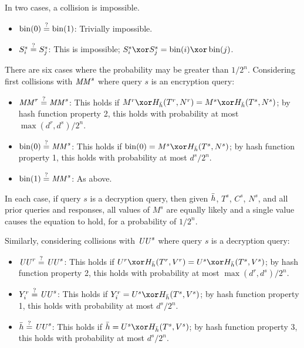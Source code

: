 \documentclass[hctr2.tex]{subfiles}
\begin{document}
In two cases, a collision is impossible.

\begin{itemize}
    \item \(\operatorname{bin}(0) \stackrel{\text{?}}{=} \operatorname{bin}(1)\): 
    Trivially impossible.
    \item 
    \(S_i^s \stackrel{\text{?}}{=} S_j^s\):
    This is impossible; 
    \(S_i^s \xor S_j^s = \fromint(i) \xor \fromint(j)\).
\end{itemize}

There are six cases where the probability may
be greater than \(1/2^n\).
Considering first collisions with \(\mathit{MM}^s\) where
query \(s\) is an encryption query:

\begin{itemize}
    \item \(\mathit{MM}^r \stackrel{\text{?}}{=} \mathit{MM}^s\):
    This holds if \(M^r \xor H_{\hgen}(T^r, N^r) = M^s \xor H_{\hgen}(T^s, N^s)\);
    by hash function property 2, this holds with probability at most
    \(\max(d^r, d^s)/2^n\).
    \item \(\operatorname{bin}(0) \stackrel{\text{?}}{=} \mathit{MM}^s\):
    This holds if \(\fromint(0) = M^s \xor H_{\hgen}(T^s, N^s)\);
    by hash function property 1, this holds with probability at most
    \(d^s/2^n\).
    \item \(\operatorname{bin}(1) \stackrel{\text{?}}{=} \mathit{MM}^s\):
    As above.
\end{itemize}

In each case, if query \(s\) is a decryption query,
then given \(\bar{h}\), \(T^s\), \(C^s\), \(N^s\),
and all prior queries and responses,
all values of \(M^s\) are equally likely 
and a single value causes the equation to hold,
for a probability of \(1/2^n\).

Similarly, considering collisions with \(\mathit{UU}^s\) where
query \(s\) is a decryption query:

\begin{itemize}
    \item \(\mathit{UU}^r \stackrel{\text{?}}{=} \mathit{UU}^s\): 
    This holds if \(U^r \xor H_{\hgen}(T^r, V^r) = U^s \xor H_{\hgen}(T^s, V^s)\);
    by hash function property 2, this holds with probability at most
    \(\max(d^r, d^s)/2^n\).
    \item \(Y_i^r \stackrel{\text{?}}{=} \mathit{UU}^s\):
    This holds if \(Y_i^r = U^s \xor H_{\hgen}(T^s, V^s)\);
    by hash function property 1, this holds with probability at most
    \(d^s/2^n\).
    \item \(\bar{h} \stackrel{\text{?}}{=} \mathit{UU}^s\):
    This holds if \(\hgen = U^s \xor H_{\hgen}(T^s, V^s)\);
    by hash function property 3, this holds with probability at most
    \(d^s/2^n\).
\end{itemize}
\end{document}

